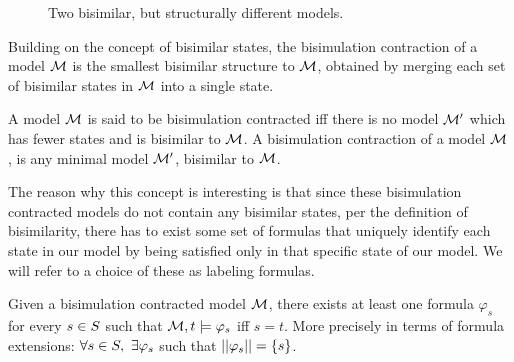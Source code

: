 \begin{figure}[h]
	\centering
	\caption{Two bisimilar, but structurally different models.}
	\label{fig:bisimmods}
\end{figure}

Building on the concept of bisimilar states, the bisimulation contraction of a model $\mathcal{M}$ is the smallest bisimilar structure to $\mathcal{M}$, obtained by merging each set of bisimilar states in $\mathcal{M}$ into a single state. 

\begin{definition}
	\label{def:bisimContract}
	A model $\mathcal{M}$ is said to be bisimulation contracted iff there is no model $\mathcal{M}'$ which has fewer states and is bisimilar to $\mathcal{M}$. A bisimulation contraction of a model $\mathcal{M}$, is any minimal model $\mathcal{M}'$, bisimilar to $\mathcal{M}$.
\end{definition}

The reason why this concept is interesting is that since these bisimulation contracted models do not contain any bisimilar states, per the definition of bisimilarity, there has to exist some set of formulas that uniquely identify each state in our model by being satisfied only in that specific state of our model. We will refer to a choice of these as labeling formulas.

\begin{definition}
	\label{def:label}
	Given a bisimulation contracted model $\mathcal{M}$, there exists at least one formula $\varphi_s$ for every $s\in S$ such that $\mathcal{M},t \models \varphi_s$ iff $s = t$. More precisely in terms of formula extensions: 
	\centering
	$\forall s\in S,~\exists\varphi_s$ such that $||\varphi_s|| = \{s\}$.
\end{definition}

